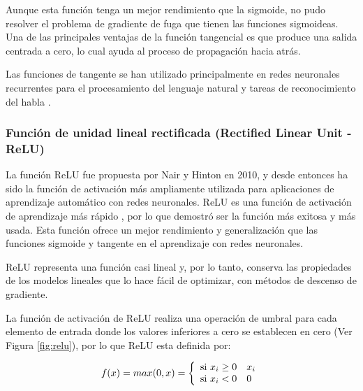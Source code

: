 Aunque esta funci\'{o}n tenga un mejor rendimiento que la sigmoide, no pudo resolver el problema de gradiente de fuga que tienen las funciones sigmoideas. Una de las principales ventajas de la funci\'{o}n tangencial es que produce una salida centrada a cero, lo cual ayuda al proceso de propagaci\'{o}n hacia atr\'{a}s.

\vspace{5mm} %

Las funciones de tangente se han utilizado principalmente en redes neuronales recurrentes para el procesamiento del lenguaje natural \cite{Reference43} y tareas de reconocimiento del habla \cite{Reference44}.
    
\subsubsection{Funci\'{o}n de unidad lineal rectificada (Rectified Linear Unit - ReLU)}

La funci\'{o}n ReLU fue propuesta por Nair y Hinton en 2010, y desde entonces ha sido la funci\'{o}n de activaci\'{o}n m\'{a}s ampliamente utilizada para aplicaciones de aprendizaje autom\'{a}tico con redes neuronales. ReLU es una funci\'{o}n de activaci\'{o}n de aprendizaje m\'{a}s r\'{a}pido \cite{Reference46}, por lo que demostr\'{o} ser la funci\'{o}n m\'{a}s exitosa y m\'{a}s usada. Esta funci\'{o}n ofrece un mejor rendimiento y generalizaci\'{o}n que las funciones sigmoide y tangente en el aprendizaje con redes neuronales.

\vspace{5mm} %

ReLU representa una función casi lineal y, por lo tanto, conserva las propiedades de los modelos lineales que lo hace fácil de optimizar, con métodos de descenso de gradiente.

\vspace{5mm} %

La función de activación de ReLU realiza una operación de umbral para cada elemento de entrada donde los valores inferiores a cero se establecen en cero (Ver Figura \ref{fig:relu}), por lo que ReLU esta definida por:

\begin{equation}
f(x) = max(0,x) = \left\lbrace
\begin{array}{ll}
\textup{si } x_{i}\geq0 & x_{i}\\
\textup{si } x_{i} < 0 & 0
\end{array}
\right.
\end{equation}

